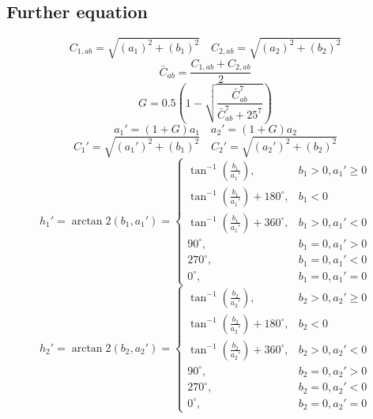 \begin{appendices}
	
\section{Further equation}\label{further equation}
\begin{equation}
C_{1,ab}=\sqrt{(a_{1})^{2}+(b_{1})^{2}} \quad C_{2,ab}=\sqrt{(a_{2})^{2}+(b_{2})^{2}}
\end{equation}
\begin{equation}
\bar{C}_{ab}=\frac{C_{1,ab}+C_{2,ab}}{2}
\end{equation}
\begin{equation}
G = 0.5\left(1-\sqrt{\frac{\bar{C}_{ab}^{7}}{\bar{C}_{ab}^{7}+25^7}}\right)
\end{equation}
\begin{equation}
a_{1}'=(1+G)a_{1} \quad a_{2}'=(1+G)a_{2} 
\end{equation}
\begin{equation}
C_{1}'=\sqrt{(a_{1}')^{2}+(b_{1})^2} \quad C_{2}'=\sqrt{(a_{2}')^{2}+(b_{2})^2}
\end{equation}
\begin{equation}
h_{1}' = \arctan2(b_{1},a_{1}') =
\begin{cases}
\tan^{-1}(\frac{b_{1}}{a_{1}'}), & b_{1}>0,a_{1}' \geq 0\\
\tan^{-1}(\frac{b_{1}}{a_{1}'})+180^{\circ}, & b_{1}<0\\
\tan^{-1}(\frac{b_{1}}{a_{1}'})+360^{\circ}, & b_{1}>0,a_{1}'<0 \\
90^{\circ}, & b_{1}=0,a_{1}'>0\\
270^{\circ}, & b_{1}=0,a_{1}'<0\\
0^{\circ}, & b_{1}=0,a_{1}'=0
\end{cases}
\end{equation}
\begin{equation}
h_{2}' = \arctan2(b_{2},a_{2}') =
\begin{cases}
\tan^{-1}\left(\frac{b_{2}}{a_{2}'}\right), & b_{2}>0,a_{2}' \geq 0\\
\tan^{-1}\left(\frac{b_{2}}{a_{2}'}\right)+180^{\circ}, & b_{2}<0\\
\tan^{-1}\left(\frac{b_{2}}{a_{2}'}\right)+360^{\circ}, & b_{2}>0,a_{2}'<0 \\
90^{\circ}, & b_{2}=0,a_{2}'>0\\
270^{\circ}, & b_{2}=0,a_{2}'<0\\
0^{\circ}, & b_{2}=0,a_{2}'=0
\end{cases}

\end{equation}
\end{appendices}
